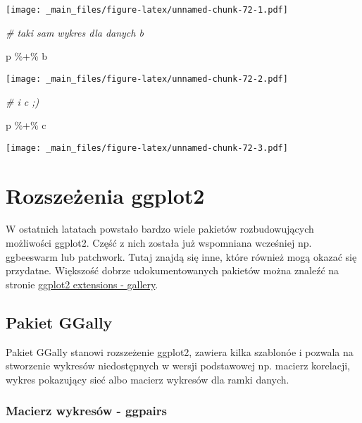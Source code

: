 \documentclass[
]{book}
\newenvironment{Shaded}{\begin{snugshade}}{\end{snugshade}}
\newcommand{\CommentTok}[1]{\textcolor[rgb]{0.56,0.35,0.01}{\textit{#1}}}
\newcommand{\NormalTok}[1]{#1}
\newcommand{\SpecialCharTok}[1]{\textcolor[rgb]{0.00,0.00,0.00}{#1}}
\begin{document}
\texttt{[image: \_main\_files/figure-latex/unnamed-chunk-72-1.pdf]}

\begin{Shaded}
\begin{Highlighting}[]
\CommentTok{\# taki sam wykres dla danych b}

\NormalTok{p }\SpecialCharTok{\%+\%}\NormalTok{ b}
\end{Highlighting}
\end{Shaded}

\texttt{[image: \_main\_files/figure-latex/unnamed-chunk-72-2.pdf]}

\begin{Shaded}
\begin{Highlighting}[]
\CommentTok{\# i c ;)}

\NormalTok{p }\SpecialCharTok{\%+\%}\NormalTok{ c}
\end{Highlighting}
\end{Shaded}

\texttt{[image: \_main\_files/figure-latex/unnamed-chunk-72-3.pdf]}

\hypertarget{rozszeux17cenia-ggplot2}{%
\section{Rozszeżenia ggplot2}\label{rozszeux17cenia-ggplot2}}

W ostatnich latatach powstało bardzo wiele pakietów rozbudowujących możliwości ggplot2. Część z nich została już wspomniana wcześniej np. ggbeeswarm lub patchwork. Tutaj znajdą się inne, które również mogą okazać się przydatne. Większość dobrze udokumentowanych pakietów można znaleźć na stronie \href{https://exts.ggplot2.tidyverse.org/gallery/}{ggplot2 extensions - gallery}.

\hypertarget{pakiet-ggally}{%
\subsection{Pakiet GGally}\label{pakiet-ggally}}

Pakiet GGally stanowi rozszeżenie ggplot2, zawiera kilka szablonóe i pozwala na stworzenie wykresów niedostępnych w wersji podstawowej np. macierz korelacji, wykres pokazujący sieć albo macierz wykresów dla ramki danych.

\hypertarget{macierz-wykresuxf3w---ggpairs}{%
\subsubsection{Macierz wykresów - ggpairs}\label{macierz-wykresuxf3w---ggpairs}}
\end{document}

